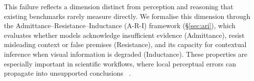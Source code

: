 

This failure reflects a dimension distinct from perception and reasoning that existing benchmarks rarely measure directly. We formalise this dimension through the Admittance--Resistance--Inductance (A-R-I) framework (\S\ref{sec:ari}), which evaluates whether models acknowledge insufficient evidence (Admittance), resist misleading context or false premises (Resistance), and its capacity for contextual inference when visual information is degraded (Inductance). These properties are especially important in scientific workflows, where local perceptual errors can propagate into unsupported conclusions ~\citep{beede2020human,nhtsa2024teslafsd}.


